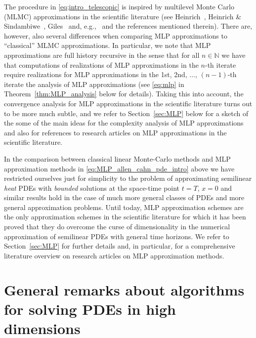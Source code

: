 \documentclass[12pt,AutoFakeBold,AutoFakeSlant]{article}
\theoremstyle{definition}
\newcommand{\N}{\mathbb{N}}
\begin{document}
	The procedure in \eqref{eq;intro_telescopic} is inspired by multilevel Monte Carlo (MLMC) approximations 
	in the scientific literature (see Heinrich~\cite{heinrich1998monte}, Heinrich \& Sindambiwe~\cite{heinrich1999monte}, Giles~\cite{giles2008multilevel} and, e.g.,~\cite{heinrich2001multilevel,giles2015multilevel} and the references mentioned therein). 
	There are, however, also several differences when comparing MLP approximations 
	to ``classical'' MLMC approximations. In particular, we note that MLP approximations are 
	full history recursive in the sense that for all $ n \in \N $ we have that computations of realizations of MLP approximations in the $ n $-th iterate require realizations for MLP approximations 
	in the 1st, 2nd, $ \dots $, $ (n - 1) $-th iterate 
	the analysis of MLP approximations (see \eqref{eq:mlp} 
	in Theorem~\ref{thm:MLP_analysis} below for details). 
	Taking this into account, the convergence analysis for MLP approximations in the scientific literature 
	turns out to be more much subtle, and we refer to Section~\ref{sec:MLP} below 
	for a sketch of the some of the main ideas for the complexity analysis of MLP approximations
	and also for references to research articles on MLP approximations in the scientific literature.


	In the comparison between 
	classical linear Monte-Carlo methods 
	and MLP approximation methods 
	in \eqref{eq:MLP_allen_cahn_pde_intro} above 
	we have restricted ourselves just for simplicity 
	to the problem of approximating 
	semilinear \emph{heat} PDEs with \emph{bounded} solutions 
	at the space-time point $ t = T $, $ x = 0 $ 
	and similar results hold in the case of much more general classes 
	of PDEs and more general approximation problems. 
	Until today, MLP approximation schemes are the only approximation schemes 
	in the scientific literature for which it has been proved
	that they do overcome the curse of dimensionality 
	in the numerical approximation 
	of semilinear PDEs with general time horizons. 
	We refer to Section~\ref{sec:MLP} for further details and, in particular, 
	for a comprehensive literature overview on research articles 
	on MLP approximation methods. 






	\section{General remarks about algorithms for solving PDEs in high dimensions}
	\label{sec:general_remarks}
\end{document}
